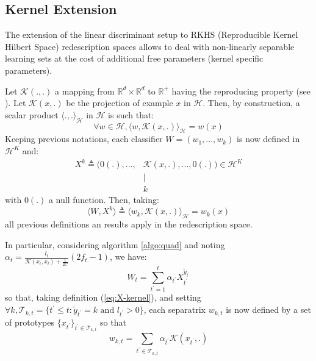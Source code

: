 \documentclass[preprint,12pt,authoryear]{elsarticle}
\begin{document}
\subsection{Kernel Extension}
The extension of the linear discriminant setup to 
RKHS (Reproducible Kernel Hilbert Space) redescription spaces 
allows to deal with non-linearly separable learning sets at the cost of additional free parameters (kernel specific parameters). 

Let $\mathcal{K}(.,.)$ a mapping from $ \mathbb{R}^d \times \mathbb{R}^d$ to $ \mathbb{R}^+$ having the reproducing property (see \cite{scholkopf2002learning}). Let $\mathcal{K}(x,.)$ be the projection of example $x$ in $\mathcal{H}$. Then, by construction, a scalar product $\langle.,.\rangle_\mathcal{H}$ in $\mathcal{H}$ is such that: 
 $$\forall w \in \mathcal{H}, \langle w,\mathcal{K}(x,.)\rangle_\mathcal{H} = w(x) $$
Keeping previous notations, each classifier $W = (w_1,...,w_k)$ is now defined in $\mathcal{H}^K$ and:
 \begin{align}\label{eq:X-kernel}
 X^k \triangleq (0(.), ..., & \mathcal{K}(x,.), ..., 0(.)) \in \mathcal{H}^{K}\\
 &\mid\nonumber\\
 &k\nonumber
 \end{align}
with $0(.)$ a null function. Then, taking:
$$\langle W,X^k\rangle \triangleq \langle w_k,\mathcal{K}(x,.)\rangle_\mathcal{H} = w_k(x)$$
all previous definitions an results apply in the redescription space.



In particular, considering algorithm \ref{algo:quad} and noting $\alpha_t = \frac {l_{t}}{\mathcal{K}(x_{t},x_{t})+\frac{1}{2C}} (2f_{t} - 1)$, we have:
$$W_t = \sum_{t^\prime = 1} ^t \alpha_{t^\prime} X_{t^\prime}^{\tilde{y}_{t^\prime}} 
$$
so that, taking definition (\ref{eq:X-kernel}), and setting $\forall k, \mathcal{T}_{k,t} = \{{t^{\prime}} \leq t: \tilde{y}_{t^{\prime}} = k \text{ and } l_{t^{\prime}} > 0\}$, each 
separatrix $w_{k,t}$ is now defined by a set of prototypes 
$\{x_{t^{\prime}}\}_{{t^{\prime}}\in \mathcal{T}_{k,t}}$ 
so that 
	$$w_{k,t} = \sum_{t^{\prime}\in \mathcal{T}_{k,t}} \alpha_{t^{\prime}} \mathcal{K}(x_{t^{\prime}},.)$$
\end{document}
